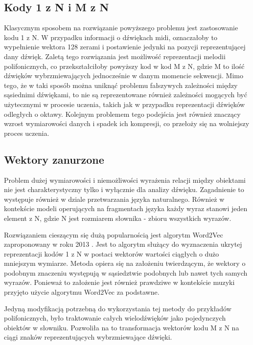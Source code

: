 {{        \subsection{Kody 1 z N i M z N}
        {
            Klasycznym sposobem na rozwiązanie powyższego problemu jest zastosowanie kodu 1 z N. W przypadku
            informacji o dźwiękach midi, oznaczałoby to wypełnienie wektora 128 zerami i postawienie jedynki na 
            pozycji reprezentującej dany dźwięk. 
            Zaletą tego rozwiązania jest możliwość reprezentacji melodii polifonicznych, co przekształciłoby
            powyższy kod w kod M z N, gdzie M to ilość dźwięków wybrzmiewających jednocześnie w danym momencie sekwencji.
            Mimo tego, że w taki sposób można uniknąć problemu fałszywych zależności między sąsiednimi dźwiękami, 
            to nie są reprezentowane również zależności mogących być użytecznymi w procesie uczenia, 
            takich jak w przypadku reprezentacji dźwięków odległych o oktawy. 
            Kolejnym problemem tego podejścia jest również znaczący wzrost wymiarowości danych i spadek ich kompresji,
            co przełoży się na wolniejszy proces uczenia.
        }

        \subsection{Wektory zanurzone}
        {
            Problem dużej wymiarowości i niemożliwości wyrażenia relacji między obiektami nie jest
            charakterystyczny tylko i wyłącznie dla analizy dźwięku. Zagadnienie to  występuje również w dziale
            przetwarzania języka naturalnego. Również w kontekście modeli operujących na fragmentach języka każdy wyraz stanowi
            jeden element z N, gdzie N jest rozmiarem słownika - zbioru wszystkich wyrazów.

            Rozwiązaniem cieszącym się dużą popularnością jest algorytm Word2Vec zaproponowany w roku 2013 \cite{Mikolov2013EfficientEO}.
            Jest to algorytm służący do wyznaczenia ukrytej reprezentacji kodów 1 z N w postaci wektorów wartości ciągłych
            o dużo mniejszym wymiarze. Metoda opiera się na założeniu twierdzącym, że wektory 
            o podobnym znaczeniu występują w sąsiedztwie podobnych lub nawet tych samych wyrazów. Ponieważ to założenie 
            jest również prawdziwe w kontekście muzyki przyjęto użycie algorytmu Word2Vec za podstawne.
            
            Jedyną modyfikacją potrzebną do wykorzystania tej metody do przykładów polifonicznych, było traktowanie 
            całych wielodźwięków jako pojedynczych obiektów w słowniku. Pozwoliła na to transformacja wektorów kodu 
            M z N na ciągi znaków reprezentujących wybrzmiewające dźwięki.
        }
    }

}
